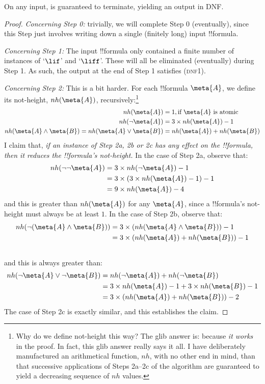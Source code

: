 \documentclass[../../../include/open-logic-section]{subfiles}
\begin{document}
\begin{lem}\label{lem:IntoDNFHalts}
	On any input, \intoDNF{} is guaranteed to terminate, yielding an output in DNF.
	\begin{proof}
		\emph{Concerning Step 0:} trivially, we will complete Step 0 (eventually), since this Step just involves writing down a single (finitely long) input !!{formula}.
		
		\emph{Concerning Step 1:} The input !!{formula} only contained a finite number of instances of `$\lif$' and `$\liff$'. These will all be eliminated (eventually) during Step 1. As such, the output at the end of Step 1 satisfies (\textsc{dnf1}). 
		
		\emph{Concerning Step 2:} This is a bit harder. For each !!{formula} $\meta{A}$, we define its not-height, $nh(\meta{A})$, recursively:\footnote{Why do we define not-height this way? The glib answer is: because \emph{it works} in the proof. In fact, this glib answer really says it all. I have deliberately manufactured an arithmetical function, $nh$, with no other end in mind, than that successive applications of Steps 2a--2c of the algorithm are guaranteed to yield a decreasing sequence of $nh$ values.}
			\begin{align*}
				nh(\meta{A}) &= 1, \text{if }\meta{A}\text{ is atomic}\\
				nh(\lnot \meta{A}) &= 3\times{nh(\meta{A})} - 1\\
				nh(\meta{A} \land \meta{B}) = nh(\meta{A} \lor \meta{B}) &= nh(\meta{A}) + nh(\meta{B})
			\end{align*}
		I claim that, \emph{if an instance of Step 2a, 2b or 2c has any effect on the !!{formula}, then it reduces the !!{formula}'s not-height.} In the case of Step 2a, observe that:
		\begin{align*}
		nh(\lnot\lnot\meta{A}) &= 3 \times nh(\lnot\meta{A}) -1 \\
		&= 3\times(3 \times nh(\meta{A})-1) -1 \\
		& = 9\times nh(\meta{A}) - 4
		\end{align*}
		and this is greater than $nh(\meta{A})$ for any $\meta{A}$, since a !!{formula}'s not-height must always be at least $1$. In the case of Step 2b, observe that:
	\begin{align*}
				nh(\lnot(\meta{A} \land \meta{B})) &= 3\times (nh(\meta{A} \land \meta{B})) -1 \\
				&= 3 \times(nh(\meta{A}) + nh(\meta{B})) - 1\\\
			\end{align*}
		and this is always greater than:
		\begin{align*}
		nh(\lnot\meta{A} \lor \lnot \meta{B}) &= nh(\lnot \meta{A}) + nh(\lnot\meta{B})\\
		&= 3\times nh(\meta{A}) -1 + 3 \times nh(\meta{B}) - 1\\
		&= 3\times(nh(\meta{A}) + nh(\meta{B})) - 2
		\end{align*}
		The case of Step 2c is exactly similar, and this establishes the claim. 
		

\end{proof}
\end{lem}
\end{document}
